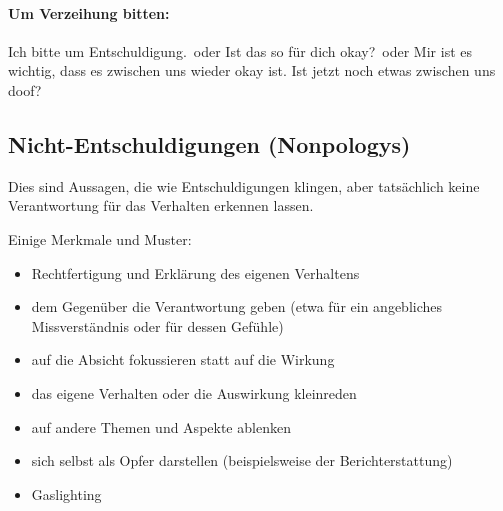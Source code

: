 \paragraph{Um Verzeihung bitten:} \glqq Ich bitte um Entschuldigung.\grqq\ oder \glqq Ist das so für dich okay?\grqq\ oder \glqq Mir ist es wichtig, dass es zwischen uns wieder okay ist. Ist jetzt noch etwas zwischen uns doof?\grqq


\subsection{Nicht-Entschuldigungen (Nonpologys)}

Dies sind Aussagen, die wie Entschuldigungen klingen, aber tatsächlich keine Verantwortung für das Verhalten erkennen lassen.

Einige Merkmale und Muster:

\begin{itemize}
  \item Rechtfertigung und Erklärung des eigenen Verhaltens
  \item dem Gegenüber die Verantwortung geben (etwa für ein angebliches Missverständnis oder für dessen Gefühle)
  \item auf die Absicht fokussieren statt auf die Wirkung
  \item das eigene Verhalten oder die Auswirkung kleinreden
  \item auf andere Themen und Aspekte ablenken
  \item sich selbst als Opfer darstellen (beispielsweise der Berichterstattung)
  \item Gaslighting
\end{itemize}
